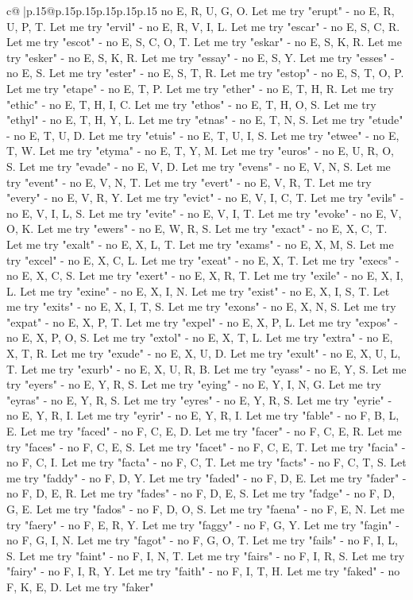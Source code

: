 \documentclass{article}
\begin{document}
{\begin{supertabular}{c@{$\;$}|p{.15\linewidth}@{}p{.15\linewidth}p{.15\linewidth}p{.15\linewidth}p{.15\linewidth}p{.15\linewidth}}
{{{no E, R, U, G, O. Let me try "erupt" {-} no E, R, U, P, T. Let me try "ervil" {-} no E, R, V, I, L. Let me try "escar" {-} no E, S, C, R. Let me try "escot" {-} no E, S, C, O, T. Let me try "eskar" {-} no E, S, K, R. Let me try "esker" {-} no E, S, K, R. Let me try "essay" {-} no E, S, Y. Let me try "esses" {-} no E, S. Let me try "ester" {-} no E, S, T, R. Let me try "estop" {-} no E, S, T, O, P. Let me try "etape" {-} no E, T, P. Let me try "ether" {-} no E, T, H, R. Let me try "ethic" {-} no E, T, H, I, C. Let me try "ethos" {-} no E, T, H, O, S. Let me try "ethyl" {-} no E, T, H, Y, L. Let me try "etnas" {-} no E, T, N, S. Let me try "etude" {-} no E, T, U, D. Let me try "etuis" {-} no E, T, U, I, S. Let me try "etwee" {-} no E, T, W. Let me try "etyma" {-} no E, T, Y, M. Let me try "euros" {-} no E, U, R, O, S. Let me try "evade" {-} no E, V, D. Let me try "evens" {-} no E, V, N, S. Let me try "event" {-} no E, V, N, T. Let me try "evert" {-} no E, V, R, T. Let me try "every" {-} no E, V, R, Y. Let me try "evict" {-} no E, V, I, C, T. Let me try "evils" {-} no E, V, I, L, S. Let me try "evite" {-} no E, V, I, T. Let me try "evoke" {-} no E, V, O, K. Let me try "ewers" {-} no E, W, R, S. Let me try "exact" {-} no E, X, C, T. Let me try "exalt" {-} no E, X, L, T. Let me try "exams" {-} no E, X, M, S. Let me try "excel" {-} no E, X, C, L. Let me try "exeat" {-} no E, X, T. Let me try "execs" {-} no E, X, C, S. Let me try "exert" {-} no E, X, R, T. Let me try "exile" {-} no E, X, I, L. Let me try "exine" {-} no E, X, I, N. Let me try "exist" {-} no E, X, I, S, T. Let me try "exits" {-} no E, X, I, T, S. Let me try "exons" {-} no E, X, N, S. Let me try "expat" {-} no E, X, P, T. Let me try "expel" {-} no E, X, P, L. Let me try "expos" {-} no E, X, P, O, S. Let me try "extol" {-} no E, X, T, L. Let me try "extra" {-} no E, X, T, R. Let me try "exude" {-} no E, X, U, D. Let me try "exult" {-} no E, X, U, L, T. Let me try "exurb" {-} no E, X, U, R, B. Let me try "eyass" {-} no E, Y, S. Let me try "eyers" {-} no E, Y, R, S. Let me try "eying" {-} no E, Y, I, N, G. Let me try "eyras" {-} no E, Y, R, S. Let me try "eyres" {-} no E, Y, R, S. Let me try "eyrie" {-} no E, Y, R, I. Let me try "eyrir" {-} no E, Y, R, I. Let me try "fable" {-} no F, B, L, E. Let me try "faced" {-} no F, C, E, D. Let me try "facer" {-} no F, C, E, R. Let me try "faces" {-} no F, C, E, S. Let me try "facet" {-} no F, C, E, T. Let me try "facia" {-} no F, C, I. Let me try "facta" {-} no F, C, T. Let me try "facts" {-} no F, C, T, S. Let me try "faddy" {-} no F, D, Y. Let me try "faded" {-} no F, D, E. Let me try "fader" {-} no F, D, E, R. Let me try "fades" {-} no F, D, E, S. Let me try "fadge" {-} no F, D, G, E. Let me try "fados" {-} no F, D, O, S. Let me try "faena" {-} no F, E, N. Let me try "faery" {-} no F, E, R, Y. Let me try "faggy" {-} no F, G, Y. Let me try "fagin" {-} no F, G, I, N. Let me try "fagot" {-} no F, G, O, T. Let me try "fails" {-} no F, I, L, S. Let me try "faint" {-} no F, I, N, T. Let me try "fairs" {-} no F, I, R, S. Let me try "fairy" {-} no F, I, R, Y. Let me try "faith" {-} no F, I, T, H. Let me try "faked" {-} no F, K, E, D. Let me try "faker" }}}
\end{supertabular}}
\end{document}
